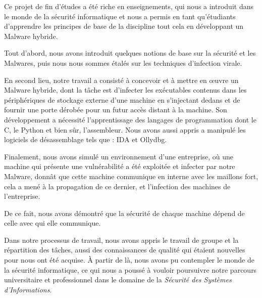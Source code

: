 
Ce projet de fin d'études a été riche en enseignements, qui nous a introduit dans le monde de la sécurité informatique 
et nous a permis en tant qu'étudiants d'apprendre les principes de base de la discipline tout cela en développant un 
Malware hybride.

Tout d'abord, nous avons introduit quelques notions de base sur la sécurité et les Malwares, puis nous nous sommes 
étalés sur les techniques d'infection virale.

En second lieu, notre travail a consisté à concevoir et à mettre en œuvre un Malware hybride, dont la tâche est 
d'infecter les exécutables contenus dans les périphériques de stockage externe d'une machine en s'injectant dedans et 
de fournir une porte dérobée pour un futur accès distant à la machine. Son développement a nécessité l'apprentissage 
des langages de programmation dont le C, le Python et bien sûr, l'assembleur. Nous avons aussi appris a manipulé les 
logiciels de désassemblage tels que : IDA et Ollydbg.

Finalement, nous avons simulé un environnement d'une entreprise, où une machine qui présente une vulnérabilité a été 
exploitée et infecter par notre Malware, donnât que cette machine communique en interne avec les maillons fort, 
cela a mené à la propagation de ce dernier, et l'infection des machines de l'entreprise.

De ce fait, nous avons démontré que la sécurité de chaque machine dépend de celle avec qui elle communique.

Dans notre processus de travail, nous avons appris le travail de groupe et la répartition des tâches, aussi des
connaissances de qualité qui étaient nouvelles pour nous ont été acquise. À partir de là, nous avons pu contempler 
le monde de la sécurité informatique, ce qui nous a poussé à vouloir poursuivre notre parcours universitaire et 
professionnel dans le domaine de la \emph{Sécurité des Systèmes d'Informations}.